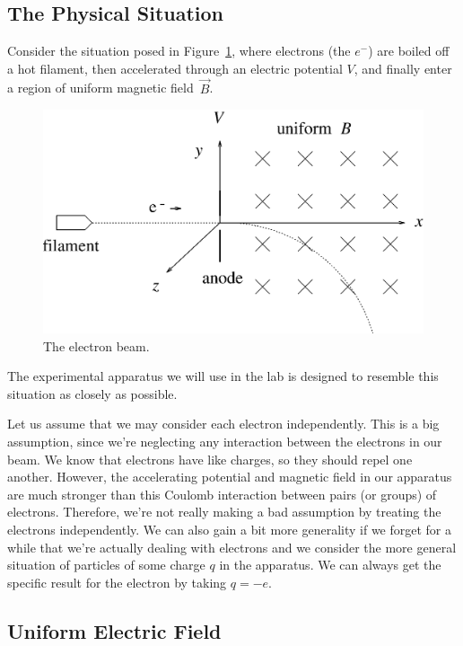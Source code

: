 \subsection{The Physical Situation}

Consider the situation posed in Figure~\ref{fig:ed:elec}, where electrons 
(the $e^-$) are boiled off a hot filament, then accelerated through an 
electric potential $V$, and finally enter a region of uniform magnetic 
field~$\vec{B}$.
\begin{figure}[htb]
\centering \epsfxsize=10cm \includegraphics[scale=0.6]{3_electrondynamics/electron.eps}
\caption{The electron beam.}
\label{fig:ed:elec}
\end{figure}
The experimental apparatus we will use in the lab is designed to resemble this 
situation as closely as possible.
 
Let us assume that we may consider each electron independently. This is a big 
assumption, since we're neglecting any interaction between the electrons in 
our beam.  We know that electrons have like charges, so they should repel one
another. However, the accelerating potential and magnetic field in our 
apparatus are much stronger than this Coulomb interaction between pairs (or 
groups) of electrons.  Therefore, we're not really making a bad assumption by 
treating the electrons independently. We can also gain a bit more generality if
we forget for a while that we're actually dealing with electrons and we 
consider the more general situation of particles of some charge $q$ in the 
apparatus.  We can always get the specific result for the electron by taking 
$q=-e$. 

\subsection{Uniform Electric Field}

